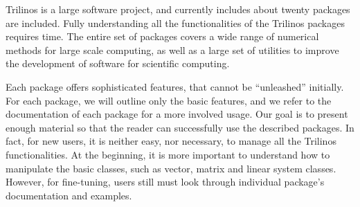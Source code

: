 \smallskip

Trilinos is a large software project, and currently includes about
twenty packages are included. Fully understanding all the
functionalities of the Trilinos packages requires time. The entire set
of packages covers a wide range of numerical methods for large scale
computing, as well as a large set of utilities to improve the
development of software for scientific computing.

Each package offers sophisticated features, that cannot be ``unleashed''
initially.  For each package, we will outline only the basic features,
and we refer to the documentation of each package for a more involved
usage. Our goal is to present enough material so that the reader can
successfully use the described packages.  In fact, for new users, it is
neither easy, nor necessary, to manage all the Trilinos functionalities.
At the beginning, it is more important to understand how to manipulate
the basic classes, such as vector, matrix and linear system classes.
However, for fine-tuning, users still must look through individual
package's documentation and examples.

\medskip

